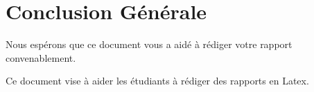 \chapter*{Conclusion Générale}

Nous espérons que ce document vous a aidé à rédiger votre rapport convenablement.

Ce document vise à aider les étudiants à rédiger des rapports en Latex.


